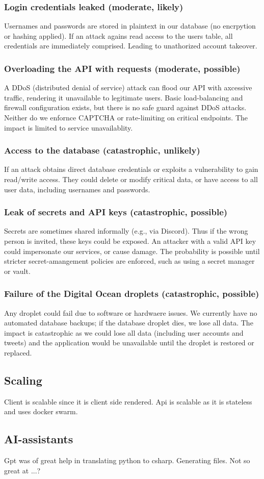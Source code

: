 \subsubsection{Login credentials leaked (moderate, likely)}
Usernames and passwords are stored in plaintext in our 
database (no encrpytion or hashing applied). If an attack 
agains read access to the users table, all credentials are 
immediately comprised. Leading to unathorized account takeover. 

\subsubsection{Overloading the API with requests (moderate, possible)} 
A DDoS (distributed denial of service) attack can flood our API with 
axcessive traffic, rendering it unavailable to legitimate users. 
Basic load-balancing and firewall configuration exists, but there is no 
safe guard against DDoS attacks. Neither do we enfornce CAPTCHA or 
rate-limiting on critical endpoints. The impact is limited to service unavailablity. 
      
\subsubsection{Access to the database (catastrophic, unlikely)} 
If an attack obtains direct database credentials or exploits a 
vulnerability to gain read/write access. They could delete or modify 
critical data, or have access to all user data, including usernames 
and passwords.

\subsubsection{Leak of secrets and API keys (catastrophic, possible)}
Secrets are sometimes shared informally (e.g., via Discord). 
Thus if the wrong person is invited, these keys could be exposed. 
An attacker with a valid API key could impersonate our services, 
or cause damage. The probability is possible until stricter 
secret-amangement policies are enforced, such as using a secret manager or vault.

\subsubsection{Failure of the Digital Ocean droplets (catastrophic, possible)}
Any droplet could fail due to software or hardwaere issues. We currently have 
no automated database backups; if the database droplet dies, we lose all data. 
The impact is catastrophic as we could lose all data (including user accounts 
and tweets) and the application would be unavailable until the droplet is 
restored or replaced.


\subsection{Scaling}

Client is scalable since it is client side rendered.
Api is scalable as it is stateless and uses docker swarm.

\subsection{AI-assistants}

Gpt was of great help in translating python to csharp.
Generating files.
Not so great at ...?